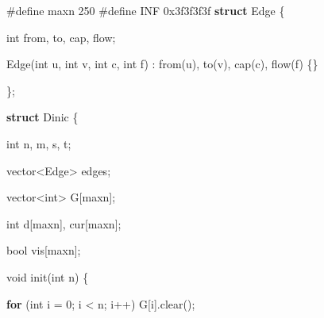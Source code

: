 \documentclass[
]{article}
\newenvironment{Shaded}{}{}
\newcommand{\BaseNTok}[1]{\textcolor[rgb]{0.25,0.63,0.44}{#1}}
\newcommand{\ControlFlowTok}[1]{\textcolor[rgb]{0.00,0.44,0.13}{\textbf{#1}}}
\newcommand{\DataTypeTok}[1]{\textcolor[rgb]{0.56,0.13,0.00}{#1}}
\newcommand{\DecValTok}[1]{\textcolor[rgb]{0.25,0.63,0.44}{#1}}
\newcommand{\KeywordTok}[1]{\textcolor[rgb]{0.00,0.44,0.13}{\textbf{#1}}}
\newcommand{\NormalTok}[1]{#1}
\newcommand{\OperatorTok}[1]{\textcolor[rgb]{0.40,0.40,0.40}{#1}}
\newcommand{\PreprocessorTok}[1]{\textcolor[rgb]{0.74,0.48,0.00}{#1}}
\begin{document}
\begin{Shaded}
\begin{Highlighting}[]
\PreprocessorTok{\#define maxn }\DecValTok{250}\PreprocessorTok{
}
\PreprocessorTok{\#define INF }\BaseNTok{0x3f3f3f3f}\PreprocessorTok{
}
\KeywordTok{struct}\NormalTok{ Edge }\OperatorTok{\{}

  \DataTypeTok{int}\NormalTok{ from}\OperatorTok{,}\NormalTok{ to}\OperatorTok{,}\NormalTok{ cap}\OperatorTok{,}\NormalTok{ flow}\OperatorTok{;}



\NormalTok{  Edge}\OperatorTok{(}\DataTypeTok{int}\NormalTok{ u}\OperatorTok{,} \DataTypeTok{int}\NormalTok{ v}\OperatorTok{,} \DataTypeTok{int}\NormalTok{ c}\OperatorTok{,} \DataTypeTok{int}\NormalTok{ f}\OperatorTok{)} \OperatorTok{:}\NormalTok{ from}\OperatorTok{(}\NormalTok{u}\OperatorTok{),}\NormalTok{ to}\OperatorTok{(}\NormalTok{v}\OperatorTok{),}\NormalTok{ cap}\OperatorTok{(}\NormalTok{c}\OperatorTok{),}\NormalTok{ flow}\OperatorTok{(}\NormalTok{f}\OperatorTok{)} \OperatorTok{\{\}}

\OperatorTok{\};}

\KeywordTok{struct}\NormalTok{ Dinic }\OperatorTok{\{}

  \DataTypeTok{int}\NormalTok{ n}\OperatorTok{,}\NormalTok{ m}\OperatorTok{,}\NormalTok{ s}\OperatorTok{,}\NormalTok{ t}\OperatorTok{;}

\NormalTok{  vector}\OperatorTok{\textless{}}\NormalTok{Edge}\OperatorTok{\textgreater{}}\NormalTok{ edges}\OperatorTok{;}

\NormalTok{  vector}\OperatorTok{\textless{}}\DataTypeTok{int}\OperatorTok{\textgreater{}}\NormalTok{ G}\OperatorTok{[}\NormalTok{maxn}\OperatorTok{];}

  \DataTypeTok{int}\NormalTok{ d}\OperatorTok{[}\NormalTok{maxn}\OperatorTok{],}\NormalTok{ cur}\OperatorTok{[}\NormalTok{maxn}\OperatorTok{];}

  \DataTypeTok{bool}\NormalTok{ vis}\OperatorTok{[}\NormalTok{maxn}\OperatorTok{];}

  \DataTypeTok{void}\NormalTok{ init}\OperatorTok{(}\DataTypeTok{int}\NormalTok{ n}\OperatorTok{)} \OperatorTok{\{}

    \ControlFlowTok{for} \OperatorTok{(}\DataTypeTok{int}\NormalTok{ i }\OperatorTok{=} \DecValTok{0}\OperatorTok{;}\NormalTok{ i }\OperatorTok{\textless{}}\NormalTok{ n}\OperatorTok{;}\NormalTok{ i}\OperatorTok{++)}\NormalTok{ G}\OperatorTok{[}\NormalTok{i}\OperatorTok{].}\NormalTok{clear}\OperatorTok{();}


\end{Highlighting}
\end{Shaded}
\end{document}
